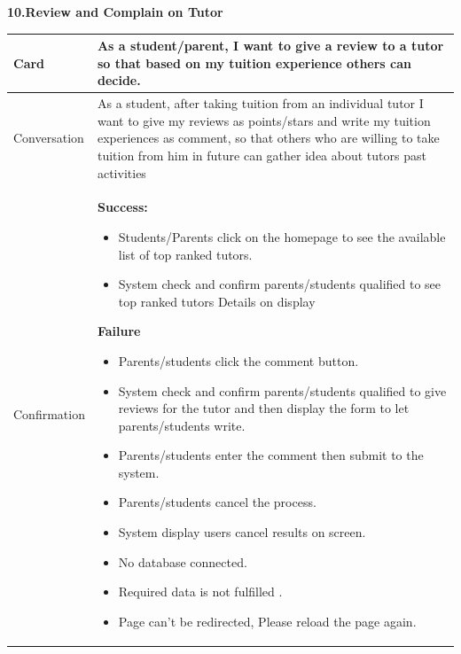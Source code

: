 \textbf{10.Review and Complain on Tutor}
\begin{center}
\setlength{\tabcolsep}{1.0cm}
\renewcommand{\arraystretch}{1.5}
        \centering
        \begin{longtable}{|m{70pt}|p{9cm}|}
            \hline
                Card & 
                    As a student/parent, I want to give a review to a tutor so that based on my tuition experience others can decide. \\
            \hline
                Conversation &
                    As a student, after taking tuition from an individual tutor I want to give my reviews as points/stars and write my tuition experiences as comment, so that others who are willing to take tuition from him in future  can gather idea about tutors past activities\\
            \hline
                Confirmation &
                   \textbf{ Success:}
                        \begin{itemize}
                            \item Students/Parents click on the homepage to see the available list of top ranked tutors.
                            \item  System check and confirm parents/students qualified to see top ranked tutors Details on display
                        \end{itemize}
                   \textbf{ Failure}
                        \begin{itemize}
                            \item    Parents/students  click the comment button.
                            \item System check and confirm parents/students qualified to give reviews for the tutor and then display the form to let parents/students write.
                            \item Parents/students enter the comment then submit to the system.
                            \item Parents/students cancel the process.
                            \item System display users cancel results on screen. 
                            \item No database connected.
                            \item Required data is not fulfilled .
                            \item Page can't be redirected, Please reload the page again.

\end{itemize}
\end{longtable}
\end{center}
